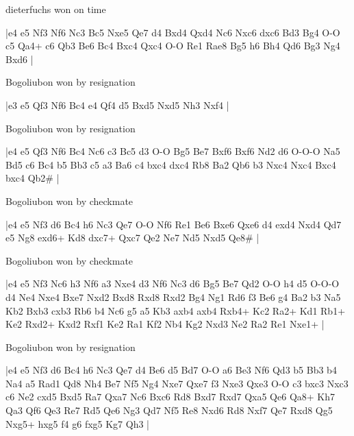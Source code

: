\showboard

dieterfuchs won on time

\makegametitle
|e4 e5 Nf3 Nf6 Nc3 Bc5 Nxe5 Qe7 d4 Bxd4 Qxd4 Nc6 Nxc6 dxc6 Bd3 Bg4 O-O c5 Qa4+ c6 Qb3 Be6 Bc4 Bxc4 Qxc4 O-O Re1 Rae8 Bg5 h6 Bh4 Qd6 Bg3 Ng4 Bxd6  |

\showboard

Bogoliubon won by resignation

\makegametitle
|e3 e5 Qf3 Nf6 Bc4 e4 Qf4 d5 Bxd5 Nxd5 Nh3 Nxf4  |

\showboard

Bogoliubon won by resignation

\makegametitle
|e4 e5 Qf3 Nf6 Bc4 Nc6 c3 Bc5 d3 O-O Bg5 Be7 Bxf6 Bxf6 Nd2 d6 O-O-O Na5 Bd5 c6 Bc4 b5 Bb3 c5 a3 Ba6 c4 bxc4 dxc4 Rb8 Ba2 Qb6 b3 Nxc4 Nxc4 Bxc4 bxc4 Qb2\#  |

\showboard

Bogoliubon won by checkmate

\makegametitle
|e4 e5 Nf3 d6 Bc4 h6 Nc3 Qe7 O-O Nf6 Re1 Be6 Bxe6 Qxe6 d4 exd4 Nxd4 Qd7 e5 Ng8 exd6+ Kd8 dxc7+ Qxc7 Qe2 Ne7 Nd5 Nxd5 Qe8\#  |

\showboard

Bogoliubon won by checkmate

\makegametitle
|e4 e5 Nf3 Nc6 h3 Nf6 a3 Nxe4 d3 Nf6 Nc3 d6 Bg5 Be7 Qd2 O-O h4 d5 O-O-O d4 Ne4 Nxe4 Bxe7 Nxd2 Bxd8 Rxd8 Rxd2 Bg4 Ng1 Rd6 f3 Be6 g4 Ba2 b3 Na5 Kb2 Bxb3 cxb3 Rb6 b4 Nc6 g5 a5 Kb3 axb4 axb4 Rxb4+ Kc2 Ra2+ Kd1 Rb1+ Ke2 Rxd2+ Kxd2 Rxf1 Ke2 Ra1 Kf2 Nb4 Kg2 Nxd3 Ne2 Ra2 Re1 Nxe1+  |

\showboard

Bogoliubon won by resignation

\makegametitle
|e4 e5 Nf3 d6 Bc4 h6 Nc3 Qe7 d4 Be6 d5 Bd7 O-O a6 Be3 Nf6 Qd3 b5 Bb3 b4 Na4 a5 Rad1 Qd8 Nh4 Be7 Nf5 Ng4 Nxe7 Qxe7 f3 Nxe3 Qxe3 O-O c3 bxc3 Nxc3 c6 Ne2 cxd5 Bxd5 Ra7 Qxa7 Nc6 Bxc6 Rd8 Bxd7 Rxd7 Qxa5 Qe6 Qa8+ Kh7 Qa3 Qf6 Qe3 Re7 Rd5 Qe6 Ng3 Qd7 Nf5 Re8 Nxd6 Rd8 Nxf7 Qe7 Rxd8 Qg5 Nxg5+ hxg5 f4 g6 fxg5 Kg7 Qh3  |

